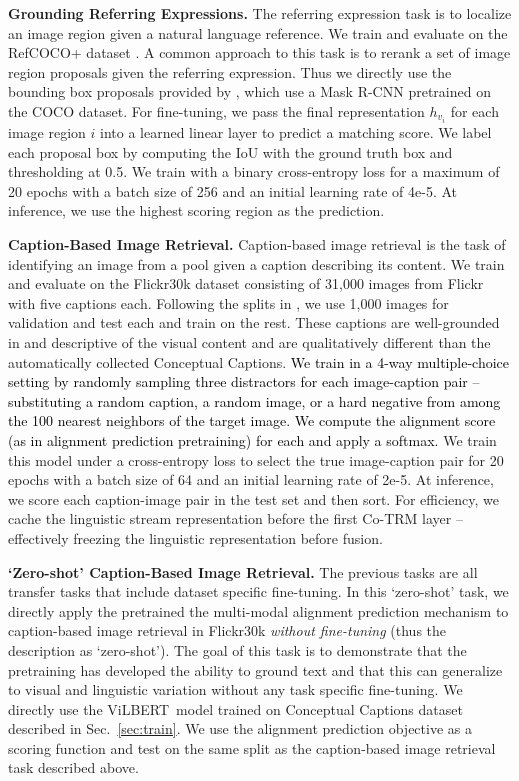 \textbf{Grounding Referring Expressions.} The referring expression task is to localize an image region given a natural language reference. We train and evaluate on the RefCOCO+ dataset \cite{kazemzadeh2014referitgame}. A common approach to this task is to rerank a set of image region proposals given the referring expression. Thus we directly use the bounding box proposals provided by \cite{yu2018mattnet}, which use a Mask R-CNN \cite{he2017mask} pretrained on the COCO dataset. For fine-tuning, we pass the final representation $h_{v_i}$ for each image region $i$ into a learned linear layer to predict a matching score. We label each proposal box by computing the IoU with the ground truth box and thresholding at 0.5. We train with a binary cross-entropy loss for a maximum of 20 epochs with a batch size of 256 and an initial learning rate of 4e-5. At inference, we use  the highest scoring region as the prediction.

\textbf{Caption-Based Image Retrieval.} Caption-based image retrieval is the task of identifying an image from a pool given a caption describing its content. We train and evaluate on the Flickr30k dataset \cite{young2014image} consisting of 31,000 images from Flickr with five captions each. Following the splits in \cite{lee2018stacked}, we use 1,000 images for validation and test each and train on the rest. These captions are well-grounded in and descriptive of the visual content and are qualitatively different than the automatically collected Conceptual Captions. \textcolor{Black}{We train in a 4-way multiple-choice setting by randomly sampling three distractors for each image-caption pair  -- substituting a random caption, a random image, or a hard negative from among the 100 nearest neighbors of the target image. We compute the alignment score (as in alignment prediction pretraining) for each and apply a softmax.} We train this model under a cross-entropy loss to select the true image-caption pair for 20 epochs with a batch size of 64 and an initial learning rate of 2e-5. At inference, we score each caption-image pair in the test set and then sort. For efficiency, we cache the linguistic stream representation before the first Co-TRM layer -- effectively freezing the linguistic representation before fusion. 

\textbf{`Zero-shot' Caption-Based Image Retrieval.} The previous tasks are all transfer tasks that include dataset specific fine-tuning. In this `zero-shot' task, we directly apply the pretrained the multi-modal alignment prediction mechanism to caption-based image retrieval in Flickr30k \cite{young2014image} \emph{without fine-tuning} (thus the description as `zero-shot'). The goal of this task is to demonstrate that the pretraining has developed the ability to ground text and that this can generalize to visual and linguistic variation without any task specific fine-tuning.  We directly use the ViLBERT~model trained on Conceptual Captions dataset described in Sec.~\ref{sec:train}. We use the alignment prediction objective as a scoring function and test on the same split as the caption-based image retrieval task described above.

